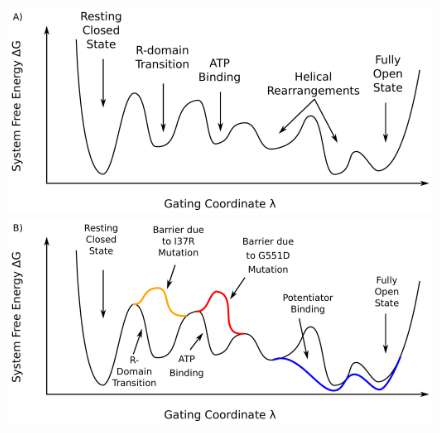 \begin{figure}
	\label{drug_action_model}
	\begin{center}
	\includegraphics[width=\textwidth]{figures/drug_landscape_1.pdf}\\
	\includegraphics[width=\textwidth]{figures/drug_landscape_3.pdf}\\
	\end{center}
	\captionsetup{singlelinecheck = false, justification=raggedright}

\end{figure}
